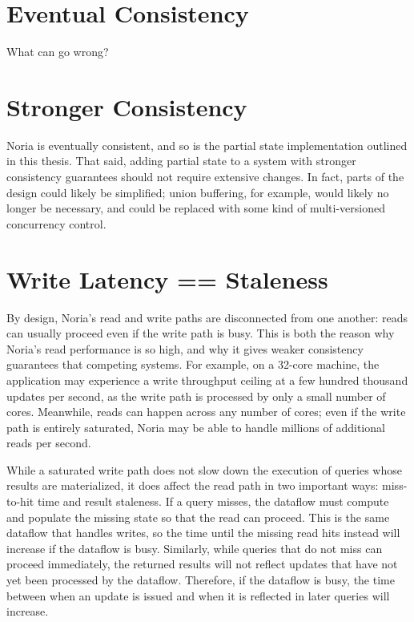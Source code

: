 \section{Eventual Consistency}

\begin{inprogress}
  What can go wrong?
\end{inprogress}

\section{Stronger Consistency}

Noria is eventually consistent, and so is the partial state implementation
outlined in this thesis. That said, adding partial state to a system with
stronger consistency guarantees should not require extensive changes. In fact,
parts of the design could likely be simplified; union buffering, for example,
would likely no longer be necessary, and could be replaced with some kind of
multi-versioned concurrency control.

\section{Write Latency == Staleness}

By design, Noria's read and write paths are disconnected from one another: reads
can usually proceed even if the write path is busy. This is both the reason why
Noria's read performance is so high, and why it gives weaker consistency
guarantees that competing systems. For example, on a 32-core machine, the
application may experience a write throughput ceiling at a few hundred thousand
updates per second, as the write path is processed by only a small number of
cores. Meanwhile, reads can happen across any number of cores; even if the write
path is entirely saturated, Noria may be able to handle millions of additional
reads per second.

While a saturated write path does not slow down the execution of queries whose
results are materialized, it does affect the read path in two important ways:
miss-to-hit time and result staleness. If a query misses, the dataflow must
compute and populate the missing state so that the read can proceed. This is the
same dataflow that handles writes, so the time until the missing read hits
instead will increase if the dataflow is busy. Similarly, while queries that do
not miss can proceed immediately, the returned results will not reflect updates
that have not yet been processed by the dataflow. Therefore, if the dataflow is
busy, the time between when an update is issued and when it is reflected in
later queries will increase.

